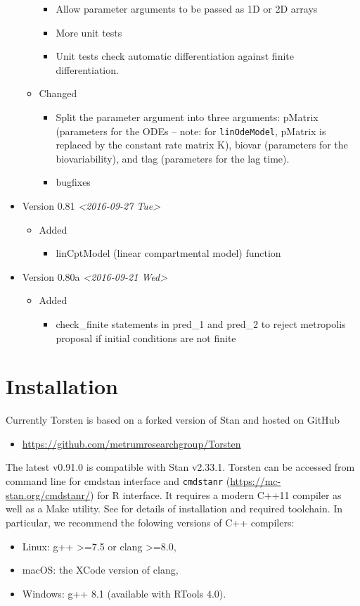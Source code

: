 \documentclass[12pt, reqno, oneside]{amsbook}
\numberwithin{equation}{chapter}
\numberwithin{figure}{chapter}
\numberwithin{table}{chapter}
\theoremstyle{remark}
\begin{document}
\begin{itemize}
\begin{itemize}
\begin{itemize}
\item Allow parameter arguments to be passed as 1D or 2D arrays
\item More unit tests
\item Unit tests check automatic differentiation against finite differentiation.
\end{itemize}
\item Changed
\begin{itemize}
\item Split the parameter argument into three arguments: pMatrix
(parameters for the ODEs -- note: for \texttt{linOdeModel}, pMatrix
is replaced by the constant rate matrix K), biovar
(parameters for the biovariability), and tlag (parameters
for the lag time).
\item bugfixes
\end{itemize}
\end{itemize}
\item Version 0.81 \textit{<2016-09-27 Tue>}
\begin{itemize}
\item Added
\begin{itemize}
\item linCptModel (linear compartmental model) function
\end{itemize}
\end{itemize}
\item Version 0.80a \textit{<2016-09-21 Wed>}
\begin{itemize}
\item Added
\begin{itemize}
\item check\_finite statements in pred\_1 and pred\_2 to reject metropolis proposal if initial conditions are not finite
\end{itemize}
\end{itemize}
\end{itemize}

\chapter{Installation}
\label{sec:orgab04073}
Currently Torsten is based on a forked version of Stan and hosted on GitHub
\begin{itemize}
\item \url{https://github.com/metrumresearchgroup/Torsten}
\end{itemize}
The latest v0.91.0 is
compatible with Stan v2.33.1. Torsten can be accessed from
command line for cmdstan interface and \texttt{cmdstanr}
(\url{https://mc-stan.org/cmdstanr/}) for R interface. It requires
a modern C++11 compiler as well as a Make utility. See \cite{cmdstan_team_2020} for details of installation and
required toolchain. In particular, we recommend the folowing versions
of C++ compilers:
\begin{itemize}
\item Linux: g++ >=7.5 or clang >=8.0,
\item macOS: the XCode version of clang,
\item Windows: g++ 8.1 (available with RTools 4.0).
\end{itemize}
\end{document}
